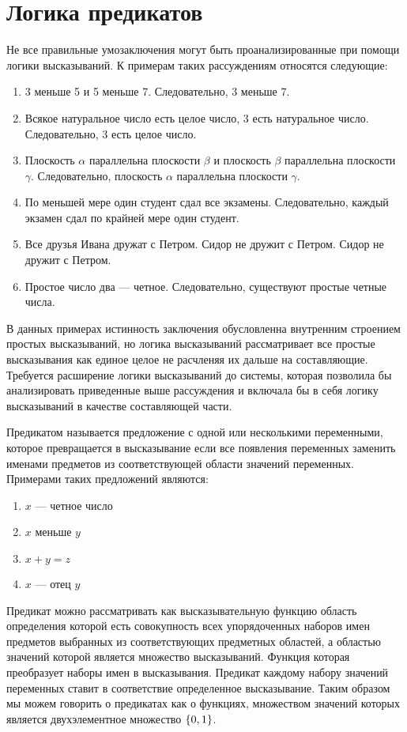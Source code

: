 \documentclass[letterpaper, 10pt]{article}
\theoremstyle{definition}
\begin{document}
\section{Логика предикатов}
	Не все правильные умозаключения могут быть проанализированные при помощи
	логики высказываний. К примерам таких рассуждениям относятся следующие:
	\begin{enumerate}
		\item 3 меньше 5 и 5 меньше 7. Следовательно, 3 меньше 7.
		\item Всякое натуральное число есть целое число, 3 есть натуральное
			число. Следовательно, 3 есть целое число.
		\item Плоскость $\alpha$ параллельна плоскости $\beta$ и плоскость
			$\beta$ параллельна плоскости $\gamma$. Следовательно, плоскость
			$\alpha$ параллельна плоскости $\gamma$.
		\item По меньшей мере один студент сдал все экзамены. Следовательно,
			каждый экзамен сдал по крайней мере один студент.
		\item Все друзья Ивана дружат с Петром. Сидор не дружит с Петром. Сидор
			не дружит с Петром.
		\item Простое число два --- четное. Следовательно, существуют простые
			четные числа.
	\end{enumerate}

	В данных примерах истинность заключения обусловленна внутренним строением
	простых высказываний, но логика высказываний рассматривает все простые
	высказывания как единое целое не расчленяя их дальше на составляющие.
	Требуется расширение логики высказываний до системы, которая позволила бы
	анализировать приведенные выше рассуждения и включала бы в себя логику
	высказываний в качестве составляющей части.

	Предикатом называется предложение с одной или несколькими
	переменными, которое превращается в высказывание если все появления
	переменных заменить именами предметов из соответствующей области значений
	переменных.
	Примерами таких предложений являются:
	\begin{enumerate}
		\item $x$ --- четное число
		\item $x$ меньше $y$
		\item $x + y = z$
		\item $x$ --- отец $y$
	\end{enumerate}
	
	Предикат можно рассматривать как высказывательную функцию область 
	определения которой есть совокупность всех упорядоченных наборов имен
	предметов выбранных из соответствующих предметных областей, а областью
	значений которой является множество высказываний. Функция которая
	преобразует наборы имен в высказывания.
	Предикат каждому набору значений переменных ставит в соответствие 
	определенное высказывание. Таким образом мы можем говорить о
	предикатах как о функциях, множеством значений которых является
	двухэлементное множество $\left\{0,1\right\}$.
\end{document}
